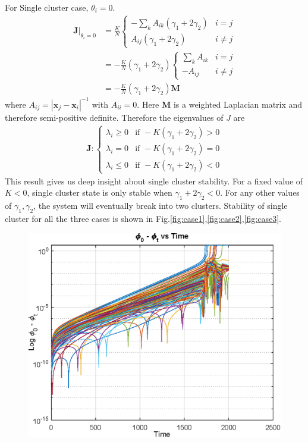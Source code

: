 \documentclass[superscriptaddress,reprint,amssymb, amsmath,aps, pre]{revtex4-1}
\begin{document}
{{        For Single cluster case, \(\theta_i = 0\). 
        \begin{align}
            \left.\mathbf{J}\right|_{\theta_i = 0} &= \frac{K}{N}\begin{cases}
                -\sum_{k} A_{ik} (\gamma_1 + 2\gamma_2) & i = j  \nonumber \\
                A_{ij}(\gamma_1 + 2\gamma_2) & i \neq j
            \end{cases}\\
            &= -\frac{K}{N}(\gamma_1 + 2\gamma_2) \begin{cases}
                \sum_{k} A_{ik} & i = j \nonumber\\
                -A_{ij} & i \neq j
            \end{cases}\\
            &= -\frac{K}{N}(\gamma_1 + 2\gamma_2) \mathbf{M}
        \end{align}
        where \(A_{ij} = |\mathbf{x}_j - \mathbf{x}_i|^{-1}\) with \(A_{ii} = 0\). Here \(\mathbf{M}\) is a weighted Laplacian matrix and therefore semi-positive definite. Therefore the eigenvalues of \(J\) are 
        \begin{align}
            \mathbf{J} : \begin{cases}
                \lambda_i \geq 0 & \text{if } -K(\gamma_1 + 2\gamma_2) > 0 \\
                \lambda_i = 0 & \text{if } -K(\gamma_1 + 2\gamma_2) = 0 \\
                \lambda_i \leq 0 & \text{if } -K(\gamma_1 + 2\gamma_2) < 0 
            \end{cases}
        \end{align} 
        This result gives us deep insight about single cluster stability. For a fixed value of \(K < 0\), single cluster state is only stable when \(\gamma_1 + 2\gamma_2 < 0\). For any other values of \(\gamma_1,\gamma_2\), the system will eventually break into two clusters. Stability of single cluster for all the three cases is shown in Fig.\ref{fig:case1},\ref{fig:case2},\ref{fig:case3}.
        \begin{figure}[h!]
            \includegraphics[width = \linewidth]{unstablePositive.eps}

\end{figure}}}
\end{document}
